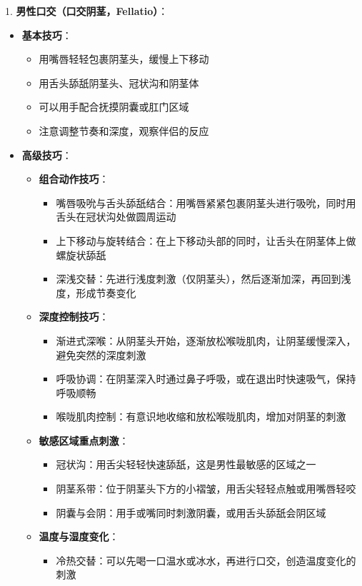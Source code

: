 \documentclass[12pt,UTF8]{ctexbook}
\begin{document}
1. \textbf{男性口交（口交阴茎，Fellatio）}：
  \begin{itemize}
  \item \textbf{基本技巧}：
    \begin{itemize}
    \item 用嘴唇轻轻包裹阴茎头，缓慢上下移动
    \item 用舌头舔舐阴茎头、冠状沟和阴茎体
    \item 可以用手配合抚摸阴囊或肛门区域
    \item 注意调整节奏和深度，观察伴侣的反应
    \end{itemize}
  \item \textbf{高级技巧}：
    \begin{itemize}
    \item \textbf{组合动作技巧}：
      \begin{itemize}
      \item 嘴唇吸吮与舌头舔舐结合：用嘴唇紧紧包裹阴茎头进行吸吮，同时用舌头在冠状沟处做圆周运动
      \item 上下移动与旋转结合：在上下移动头部的同时，让舌头在阴茎体上做螺旋状舔舐
      \item 深浅交替：先进行浅度刺激（仅阴茎头），然后逐渐加深，再回到浅度，形成节奏变化
      \end{itemize}
    \item \textbf{深度控制技巧}：
      \begin{itemize}
      \item 渐进式深喉：从阴茎头开始，逐渐放松喉咙肌肉，让阴茎缓慢深入，避免突然的深度刺激
      \item 呼吸协调：在阴茎深入时通过鼻子呼吸，或在退出时快速吸气，保持呼吸顺畅
      \item 喉咙肌肉控制：有意识地收缩和放松喉咙肌肉，增加对阴茎的刺激
      \end{itemize}
    \item \textbf{敏感区域重点刺激}：
      \begin{itemize}
      \item 冠状沟：用舌尖轻轻快速舔舐，这是男性最敏感的区域之一
      \item 阴茎系带：位于阴茎头下方的小褶皱，用舌尖轻轻点触或用嘴唇轻咬
      \item 阴囊与会阴：用手或嘴同时刺激阴囊，或用舌头舔舐会阴区域
      \end{itemize}
    \item \textbf{温度与湿度变化}：
      \begin{itemize}
      \item 冷热交替：可以先喝一口温水或冰水，再进行口交，创造温度变化的刺激

\end{itemize}
\end{itemize}
\end{itemize}
\end{document}

